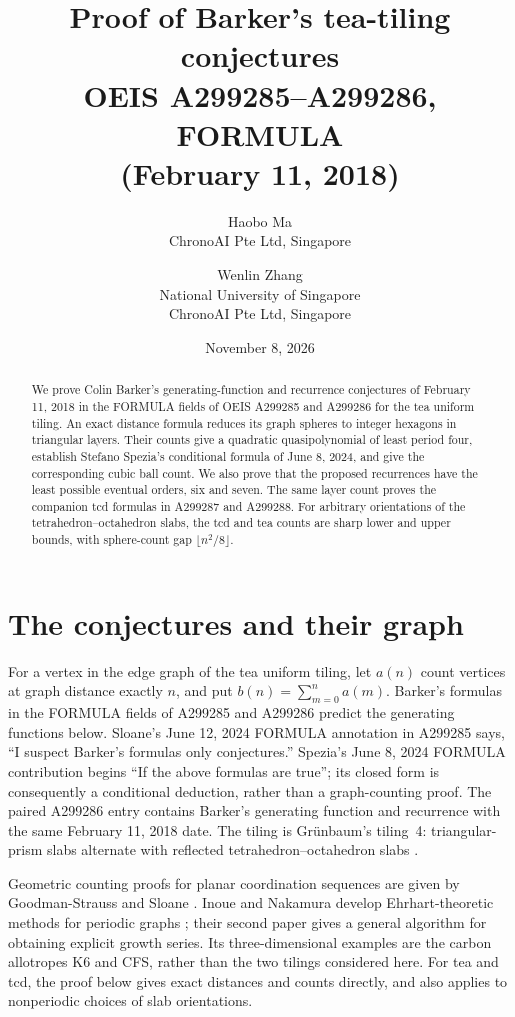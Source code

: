 \documentclass[11pt]{article}
\title{Proof of Barker's tea-tiling conjectures\\OEIS A299285--A299286, FORMULA\\(February 11, 2018)}
\author{Haobo Ma\\\small ChronoAI Pte Ltd, Singapore
\and Wenlin Zhang\\\small National University of Singapore\\\small ChronoAI Pte Ltd, Singapore}
\date{November 8, 2026}
\begin{document}
\maketitle
\begin{abstract}
We prove Colin Barker's generating-function and recurrence conjectures of
February 11, 2018 in the FORMULA fields of OEIS A299285 and A299286
for the tea uniform tiling.
An exact distance formula reduces its graph spheres to integer hexagons in
triangular layers. Their counts give a quadratic quasipolynomial of least
period four, establish Stefano Spezia's conditional formula of June 8, 2024,
and give the corresponding cubic ball count. We also prove that the proposed
recurrences have the least possible eventual orders, six and seven. The same
layer count proves the companion tcd formulas in A299287 and A299288.
For arbitrary orientations of the tetrahedron--octahedron slabs, the tcd
and tea counts are sharp lower and upper bounds, with sphere-count gap
$\lfloor n^2/8\rfloor$.
\end{abstract}

\section{The conjectures and their graph}
For a vertex in the edge graph of the tea uniform tiling, let $a(n)$ count
vertices at graph distance exactly $n$, and put $b(n)=\sum_{m=0}^n a(m)$.
Barker's formulas in the FORMULA fields of A299285 and A299286
\cite{shell,ball} predict the generating functions below. Sloane's
June 12, 2024 FORMULA annotation in A299285 says,
``I suspect Barker's formulas only conjectures.'' Spezia's June 8, 2024
FORMULA contribution begins ``If the above formulas are true''; its
closed form is consequently a conditional deduction, rather than a
graph-counting proof. The paired A299286 entry contains Barker's
generating function and recurrence with the same February 11, 2018 date.
The tiling is Gr\"unbaum's tiling~4: triangular-prism slabs alternate with
reflected tetrahedron--octahedron slabs \cite[p.~54, List~1, no.~4]{grunbaum}.

Geometric counting proofs for planar coordination sequences are given by
Goodman-Strauss and Sloane \cite{coloring}. Inoue and Nakamura develop
Ehrhart-theoretic methods for periodic graphs \cite{inoue1,inoue2}; their
second paper gives a general algorithm for obtaining explicit growth
series. Its three-dimensional examples are the carbon allotropes K6 and
CFS, rather than the two tilings considered here. For tea and tcd, the
proof below gives exact distances and counts directly, and also applies to
nonperiodic choices of slab orientations.
\end{document}
